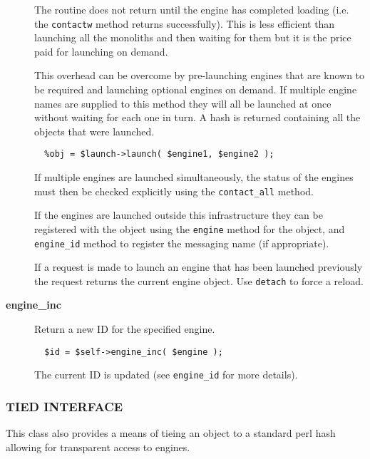 \begin{description}
The routine does not return until the engine has completed loading
(i.e. the \texttt{contactw} method returns successfully). This is less
efficient than launching all the monoliths and then waiting for
them but it is the price paid for launching on demand.



This overhead can be overcome by pre-launching engines that are
known to be required and launching optional engines on demand.
If multiple engine names are supplied to this method they will
all be launched at once without waiting for each one in turn.
A hash is returned containing all the objects that were launched.

\begin{verbatim}
  %obj = $launch->launch( $engine1, $engine2 );
\end{verbatim}


If multiple engines are launched simultaneously, the status of the
engines must then be checked explicitly using the \texttt{contact\_all}
method.



If the engines are launched outside this infrastructure they can be
registered with the object using the \texttt{engine} method for the object,
and \texttt{engine\_id} method to register the messaging name (if
appropriate).



If a request is made to launch an engine that has been launched
previously the request returns the current engine object. Use 
\texttt{detach} to force a reload.

\item[\textbf{engine\_inc}] \mbox{}

Return a new ID for the specified engine.

\begin{verbatim}
  $id = $self->engine_inc( $engine );
\end{verbatim}


The current ID is updated (see \texttt{engine\_id} for more details).

\end{description}
\subsubsection*{TIED INTERFACE\label{ORAC::Msg::EngineLaunch_TIED_INTERFACE}}

This class also provides a means of tieing an object to
a standard perl hash allowing for transparent access to
engines.



